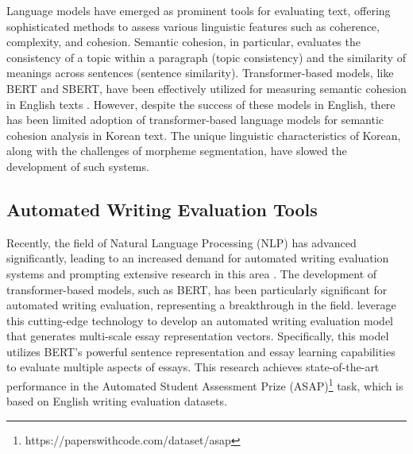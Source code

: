 Language models have emerged as prominent tools for evaluating text, offering sophisticated methods to assess various linguistic features such as coherence, complexity, and cohesion. Semantic cohesion, in particular, evaluates the consistency of a topic within a paragraph (topic consistency) and the similarity of meanings across sentences (sentence similarity). Transformer-based models, like BERT and SBERT, have been effectively utilized for measuring semantic cohesion in English texts \cite{doewes2022individual, rei2016sentence, ramesh2022automated}. However, despite the success of these models in English, there has been limited adoption of transformer-based language models for semantic cohesion analysis in Korean text. The unique linguistic characteristics of Korean, along with the challenges of morpheme segmentation, have slowed the development of such systems. 


\subsection{Automated Writing Evaluation Tools} 


Recently, the field of Natural Language Processing (NLP) has advanced significantly, leading to an increased demand for automated writing evaluation systems and prompting extensive research in this area \cite{jeon2021countering, uto2020neural, wang2022aessota}. The development of transformer-based models, such as BERT, has been particularly significant for automated writing evaluation, representing a breakthrough in the field. \cite{wang2022aessota} leverage this cutting-edge technology to develop an automated writing evaluation model that generates multi-scale essay representation vectors. Specifically, this model utilizes BERT’s powerful sentence representation and essay learning capabilities to evaluate multiple aspects of essays. This research achieves state-of-the-art performance in the Automated Student Assessment Prize (ASAP)\footnote{https://paperswithcode.com/dataset/asap} task, which is based on English writing evaluation datasets.

